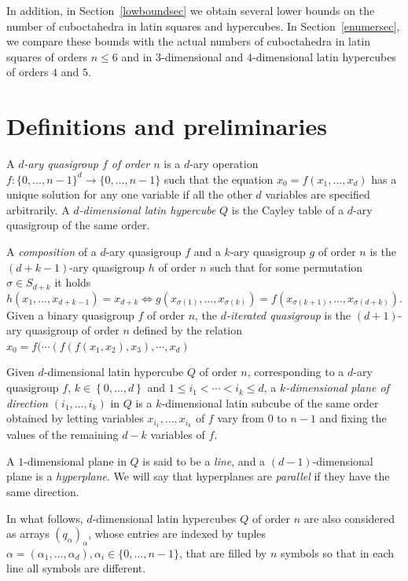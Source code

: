 \documentclass[a4paper]{article}
\begin{document}
In addition, in Section~\ref{lowboundsec} we obtain several lower bounds on the number of cuboctahedra in latin squares and hypercubes.   In Section~\ref{enumersec}, we compare these bounds with the actual numbers of cuboctahedra in latin squares of orders $n \leq 6$ and  in $3$-dimensional and $4$-dimensional latin hypercubes of orders $4$ and $5$.





\section{Definitions and preliminaries} \label{defsec}


 A \textit{$d$-ary quasigroup $f$ of order $n$} is a $d$-ary operation $f:  \{ 0, \ldots, n-1 \}^d \rightarrow \{ 0, \ldots, n-1 \}$ such that the equation $x_0 = f(x_1, \ldots, x_d)$ has a unique solution for any one variable if all the other $d$ variables are specified arbitrarily.  A \textit{$d$-dimensional latin hypercube} $Q$ is the Cayley table of  a $d$-ary quasigroup of the same order.


A \textit{composition}  of a $d$-ary quasigroup $f$ and a $k$-ary quasigroup $g$ of order $n$  is the $(d+k-1)$-ary quasigroup  $h$ of order $n$ such that for some permutation $\sigma \in S_{d+k}$ it holds
$$h(x_1, \ldots, x_{d+k-1}) = x_{d+k} \Leftrightarrow g(x_{\sigma(1)}, \ldots, x_{\sigma(k)}) = f(x_{\sigma(k+1)},   \ldots, x_{\sigma(d+k)} ). $$
Given a binary quasigroup $f$  of order $n$,  the \textit{$d$-iterated quasigroup} is the $(d+1)$-ary quasigroup of order $n$ defined by the relation $x_0 = f( \cdots (f (f(x_1, x_2), x_3), \cdots, x_{d})$ 

Given $d$-dimensional  latin hypercube $Q$ of order $n$, corresponding to a $d$-ary quasigroup $f$,  $k\in \left\{0,\ldots,d\right\}$ and $1 \leq i_1 < \cdots < i_k \leq d$,  a \textit{$k$-dimensional plane of direction $(i_1, \ldots, i_k)$}  in $Q$ is a $k$-dimensional  latin subcube of the same order  obtained by   letting   variables $x_{i_1}, \ldots, x_{i_k}$ of $f$  vary from $0$ to $n-1$ and  fixing  the values of  the remaining $d-k$ variables of $f$.

A $1$-dimensional plane in $Q$ is said to be a \textit{line}, and a $(d-1)$-dimensional plane is a \textit{hyperplane}.    We will say that hyperplanes are \textit{parallel} if they have the same direction.

In what follows, $d$-dimensional latin hypercubes  $Q$ of order $n$  are also considered as  arrays $(q_\alpha)_{\alpha}$, whose entries are indexed by tuples  $  \alpha = (\alpha_1, \ldots, \alpha_d ),  \alpha_i \in \{ 0, \ldots, n-1\}$,  that are  filled by $n$ symbols so that in each line all symbols are different.   
\end{document}
